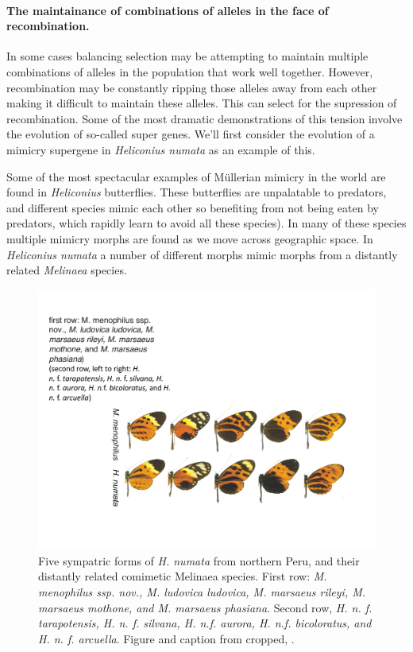 \paragraph{The maintainance of combinations of alleles in the face of recombination.}


In some cases balancing selection may be attempting to maintain multiple combinations of alleles in the population that work well together. However, recombination may be constantly ripping those alleles away from each other making it difficult to maintain these alleles. This can select for the supression of recombination. Some of the most dramatic demonstrations of this tension involve the evolution of so-called super genes. We'll first consider the evolution of a mimicry supergene in {\it Heliconius numata} as an example of this.  

Some of the most spectacular examples of M{\"u}llerian mimicry in the world are found in {\it Heliconius} butterflies. These butterflies are unpalatable to predators, and different species mimic each other so benefiting from not being eaten by predators, which rapidly learn to avoid all these species). In many of these species multiple mimicry morphs are found as we move across geographic space. In  {\it Heliconius numata} a number of different morphs mimic morphs from a distantly related {\it Melinaea} species. 

\begin{figure} %
\begin{center}
  \includegraphics[width = \textwidth]{Journal_figs/recom_selection/H_numata/H_numata.pdf}
\end{center}
\caption{Five sympatric forms of {\it H. numata} from northern Peru, and their distantly related comimetic Melinaea species.  First row: {\it M. menophilus ssp. nov., M. ludovica ludovica, M. marsaeus rileyi, M. marsaeus mothone, and M. marsaeus phasiana}. Second row, {\it H. n. f. tarapotensis, H. n. f. silvana, H. n.f. aurora, H. n.f. bicoloratus, and H. n. f. arcuella}. Figure and caption from \citet{joron2006conserved} cropped, \PLOSccBY. } \label{}  %
\end{figure}

